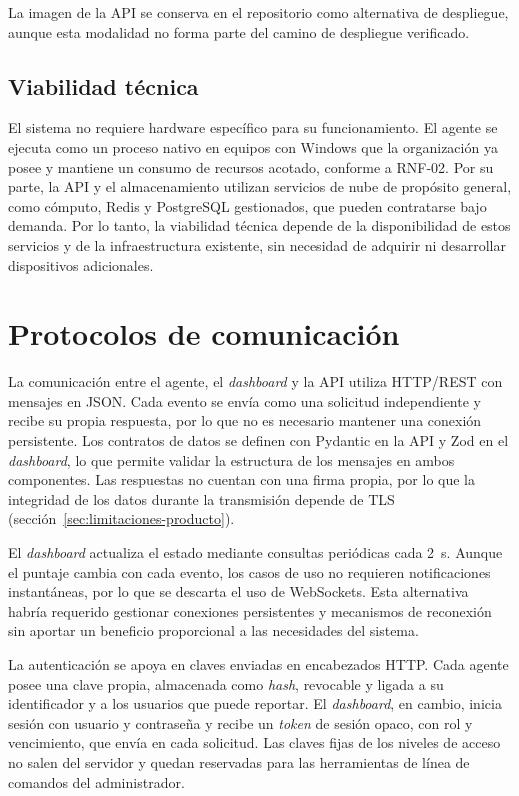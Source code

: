 La imagen de la API se conserva en el repositorio como alternativa de despliegue, aunque esta modalidad no forma parte del camino de despliegue verificado.

\subsection{Viabilidad técnica}
El sistema no requiere hardware específico para su funcionamiento. El agente se ejecuta como un proceso nativo en equipos con Windows que la organización ya posee y mantiene un consumo de recursos acotado, conforme a RNF-02. Por su parte, la API y el almacenamiento utilizan servicios de nube de propósito general, como cómputo, Redis y PostgreSQL gestionados, que pueden contratarse bajo demanda. Por lo tanto, la viabilidad técnica depende de la disponibilidad de estos servicios y de la infraestructura existente, sin necesidad de adquirir ni desarrollar dispositivos adicionales.

\section{Protocolos de comunicación}
\label{sec:protocolos}
La comunicación entre el agente, el \emph{dashboard} y la API utiliza HTTP/REST con mensajes en JSON. Cada evento se envía como una solicitud independiente y recibe su propia respuesta, por lo que no es necesario mantener una conexión persistente. Los contratos de datos se definen con Pydantic en la API y Zod en el \emph{dashboard}, lo que permite validar la estructura de los mensajes en ambos componentes. Las respuestas no cuentan con una firma propia, por lo que la integridad de los datos durante la transmisión depende de TLS (sección~\ref{sec:limitaciones-producto}).

El \emph{dashboard} actualiza el estado mediante consultas periódicas cada 2~s. Aunque el puntaje cambia con cada evento, los casos de uso no requieren notificaciones instantáneas, por lo que se descarta el uso de WebSockets. Esta alternativa habría requerido gestionar conexiones persistentes y mecanismos de reconexión sin aportar un beneficio proporcional a las necesidades del sistema.

La autenticación se apoya en claves enviadas en encabezados HTTP. Cada agente posee una clave propia, almacenada como \emph{hash}, revocable y ligada a su identificador y a los usuarios que puede reportar. El \emph{dashboard}, en cambio, inicia sesión con usuario y contraseña y recibe un \emph{token} de sesión opaco, con rol y vencimiento, que envía en cada solicitud. Las claves fijas de los niveles de acceso no salen del servidor y quedan reservadas para las herramientas de línea de comandos del administrador.

